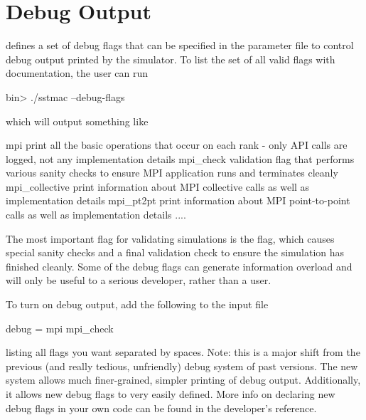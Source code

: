 
\section{Debug Output}
\label{sec:dbgoutput}
\sstmacro defines a set of debug flags that can be specified in the parameter file to control debug output printed by the simulator.
To list the set of all valid flags with documentation, the user can run

\begin{ShellCmd}
bin> ./sstmac --debug-flags
\end{ShellCmd}

which will output something like

\begin{ViFile}
    mpi
        print all the basic operations that occur on each rank - only API calls are
        logged, not any implementation details
    mpi_check
        validation flag that performs various sanity checks to ensure MPI application
        runs and terminates cleanly
    mpi_collective
        print information about MPI collective calls as well as implementation details
    mpi_pt2pt
        print information about MPI point-to-point calls as well as implementation
        details
     ....
\end{ViFile}
The most important flag for validating simulations is the  flag,
which causes special sanity checks and a final validation check to ensure the simulation has finished cleanly.
Some of the debug flags can generate information overload and will only be useful to a serious developer, rather than a user.

To turn on debug output, add the following to the input file

\begin{ViFile}
debug = mpi  mpi_check
\end{ViFile}
listing all flags you want separated by spaces.
Note: this is a major shift from the previous (and really tedious, unfriendly) debug system of past versions.
The new system allows much finer-grained, simpler printing of debug output.
Additionally, it allows new debug flags to very easily defined.
More info on declaring new debug flags in your own code can be found in the developer's reference.
